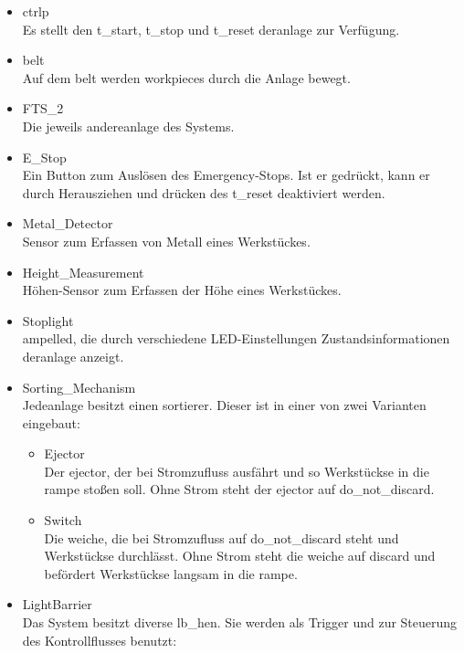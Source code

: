 \begin{itemize}
    \item \Gls{ctrlp}\\
    Es stellt den \gls{t_start}, \gls{t_stop} und \gls{t_reset} der\gls{anlage} zur Verfügung.

    \item \Gls{belt}\\
    Auf dem \gls{belt} werden \Glspl{workpiece} durch die \Gls{Anlage} bewegt.
    \item FTS\_2\\
    Die jeweils andere\gls{anlage} des Systems.
    \item E\_Stop\\
    Ein Button zum Auslösen des Emergency-Stops. Ist er gedrückt, kann er durch Herausziehen
    und drücken des \gls{t_reset} deaktiviert werden.
    \item Metal\_Detector\\
    Sensor zum Erfassen von Metall eines \Gls{Werkstück}es.
    \item Height\_Measurement\\
    Höhen-Sensor zum Erfassen der Höhe eines \Gls{Werkstück}es.
    \item Stoplight\\
    \gls{ampelled}, die durch verschiedene LED-Einstellungen Zustandsinformationen der\gls{anlage} anzeigt.
    \item Sorting\_Mechanism\\
    Jede\gls{anlage} besitzt einen \Gls{sortierer}.
    Dieser ist in einer von zwei Varianten eingebaut:
    \begin{itemize}
        \item Ejector\\
        Der \gls{ejector}, der bei Stromzufluss ausfährt und so \Glspl{Werkstück}e in die \gls{rampe} stoßen soll.
        Ohne Strom steht der \gls{ejector} auf \gls{do_not_discard}.
        \item Switch\\
        Die \gls{weiche}, die bei Stromzufluss auf \gls{do_not_discard} steht und \Glspl{Werkstück}e durchlässt.
        Ohne Strom steht die  \gls{weiche} auf \gls{discard} und befördert \Glspl{Werkstück}e
        langsam in die \gls{rampe}.
    \end{itemize}
    \item LightBarrier\\
    Das System besitzt diverse \gls{lb_he}n. Sie werden als Trigger und zur Steuerung
    des Kontrollflusses benutzt:

\end{itemize}
